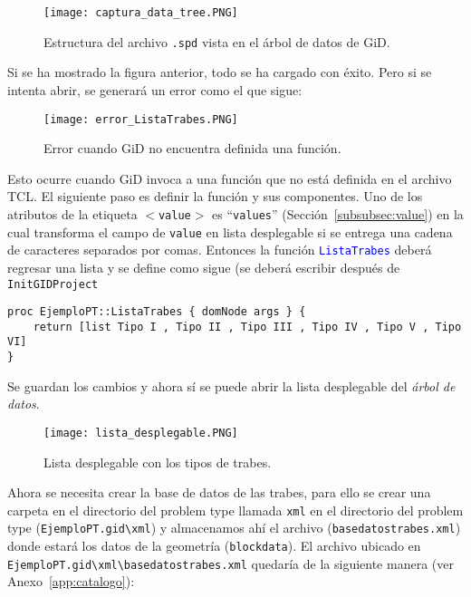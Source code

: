 \documentclass[10pt, a4paper, twocolumn]{article} %
\begin{document}
\begin{figure}[hbtp!]\centering
	\texttt{[image: captura\_data\_tree.PNG]}
	\caption{Estructura del archivo \texttt{.spd} vista en el árbol de datos de GiD.\label{fig:captura_data_tree}}
\end{figure}

Si se ha mostrado la figura anterior, todo se ha cargado con éxito. Pero si se intenta abrir, se generará un error como el que sigue:

\begin{figure}[hbt!]\centering
	\texttt{[image: error\_ListaTrabes.PNG]}
	\caption{Error cuando GiD no encuentra definida una función.\label{fig:error_ListaTrabes}}
\end{figure}

Esto ocurre cuando GiD invoca a una función que no está definida en el archivo TCL. El siguiente paso es definir la función y sus componentes. Uno de los atributos de la etiqueta \texttt{$<$value$>$} es ``\texttt{values}'' (Sección~\ref{subsubsec:value}) en la cual transforma el campo de \texttt{value} en lista desplegable si se entrega una cadena de caracteres separados por comas. Entonces la función \textcolor{blue}{\texttt{ListaTrabes}} deberá regresar una lista y se define como sigue (se deberá escribir después de \texttt{InitGIDProject}

\lstset{language=tcl} 
\begin{lstlisting}
proc EjemploPT::ListaTrabes { domNode args } {
	return [list Tipo I , Tipo II , Tipo III , Tipo IV , Tipo V , Tipo VI]
}
\end{lstlisting}

Se guardan los cambios y ahora sí se puede abrir la lista desplegable del \textit{árbol de datos}.

\begin{figure}[hbt!]\centering
	\texttt{[image: lista\_desplegable.PNG]}
	\caption{Lista desplegable con los tipos de trabes.\label{fig:lista_desplegable}}
\end{figure}

Ahora se necesita crear la base de datos de las trabes, para ello se crear una carpeta en el directorio del problem type llamada \texttt{xml} en el directorio del problem type (\texttt{EjemploPT.gid\textbackslash xml}) y almacenamos ahí el archivo (\texttt{basedatostrabes.xml}) donde estará los datos de la geometría (\texttt{blockdata}). El archivo ubicado en \texttt{EjemploPT.gid\textbackslash xml\textbackslash basedatostrabes.xml} quedaría de la siguiente manera (ver Anexo~\ref{app:catalogo}):
\end{document}
